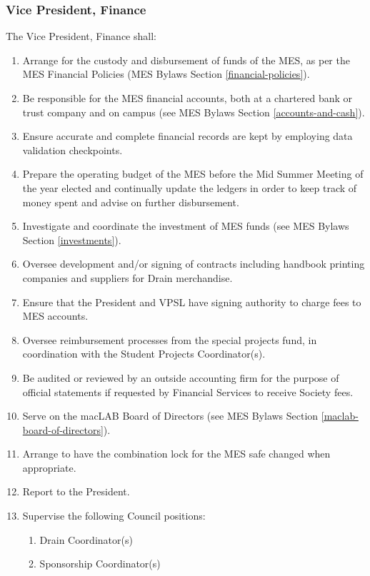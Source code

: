 \subsubsection{Vice President,
 Finance}
\label{vice-president-finance}
The Vice President, Finance shall:

\begin{enumerate}
 \item
  Arrange for the custody and disbursement of funds of the MES, as per the MES Financial Policies (MES Bylaws Section \ref{financial-policies}).
 \item
  Be responsible for the MES financial accounts, both at a chartered bank or trust company and on campus (see MES Bylaws Section \ref{accounts-and-cash}).
 \item
  Ensure accurate and complete financial records are kept by employing data validation checkpoints.
 \item
  Prepare the operating budget of the MES before the Mid Summer Meeting of the year elected and continually update the ledgers in order to keep track of money spent and advise on further disbursement.
 \item
  Investigate and coordinate the investment of MES funds (see MES Bylaws Section \ref{investments}).
 \item
  Oversee development and/or signing of contracts including handbook printing companies and suppliers for Drain merchandise.
 \item
  Ensure that the President and VPSL have signing authority to charge fees to MES accounts.
 \item
  Oversee reimbursement processes from the special projects fund, in coordination with the Student Projects Coordinator(s).
 \item
  Be audited or reviewed by an outside accounting firm for the purpose of official statements if requested by Financial Services to receive Society fees.
 \item
  Serve on the macLAB Board of Directors (see MES Bylaws Section \ref{maclab-board-of-directors}).
 \item
  Arrange to have the combination lock for the MES safe changed when appropriate.
 \item
  Report to the President.
 \item
  Supervise the following Council positions:

  \begin{enumerate}
   \item
    Drain Coordinator(s)
   \item
    Sponsorship Coordinator(s)

  \end{enumerate}
\end{enumerate}